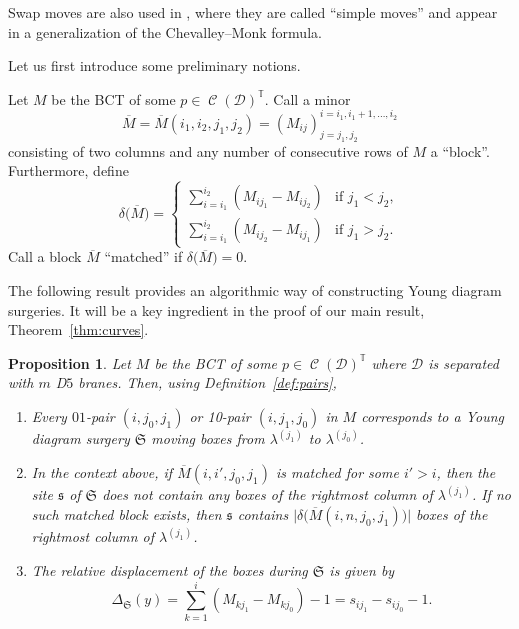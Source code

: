 \documentclass[11pt]{article}
\numberwithin{equation}{section}
\newtheorem{Proposition}[Theorem]{Proposition}
 { \theoremstyle{definition}
\newtheorem{Definition}[Theorem]{Definition}
\newtheorem{Note}[Theorem]{Note}
\newtheorem{Example}[Theorem]{Example}
\newtheorem{Remark}[Theorem]{Remark} }
\newcommand{\brane}{\mathcal D}
\newcommand{\torus}{\mathbb T}
\newcommand{\site}{\mathfrak s}
\newcommand{\surgery}{\mathfrak S}
\DeclareMathOperator{\bowvar}{\mathcal C}
\begin{document}
\begin{Remark}
Swap moves are also used in {\rm\cite{W}}, where they are called ``simple moves'' and appear in a generalization of the Chevalley--Monk formula.
\end{Remark}

Let us first introduce some preliminary notions.

\begin{Definition} \label{def:blocks}
Let $M$ be the BCT of some $p\in\bowvar(\brane)^\torus$. Call a minor
\[
\overline M = \overline{M}(i_1, i_2, j_1, j_2) = \left(M_{ij}\right)^{i = i_1, i_1+1, \dots , i_2}_{j = j_1, j_2}
\]
consisting of two columns and any number of consecutive rows of $M$ a ``block''. Furthermore, define
\[
\delta\bigl(\overline M\bigr) = \begin{cases}
\displaystyle\sum_{i = i_1}^{i_2} (M_{i j_1} - M_{i j_2}) & \text{if }j_1 < j_2, \\
\displaystyle\sum_{i = i_1}^{i_2} (M_{i j_2} - M_{i j_1}) & \text{if }j_1 > j_2.
\end{cases}
\]
Call a block $\overline M$ ``matched'' if $\delta\bigl(\overline M\bigr) = 0$.
\end{Definition}

The following result provides an algorithmic way of constructing Young diagram surgeries. It will be a key ingredient in the proof of our main result, Theorem~\ref{thm:curves}.

\begin{Proposition} \label{prop:BCT_curves}
Let $M$ be the BCT of some $p\in\bowvar(\brane)^\torus$ where $\brane$ is separated with $m$ D$5$ branes. Then, using Definition~{\rm\ref{def:pairs}},
\begin{enumerate}\itemsep=0pt
\item[$(1)$] Every $01$-pair $(i, j_0, j_1)$ or 10-pair $(i, j_1, j_0)$ in $M$ corresponds to a Young diagram surgery $\surgery$ moving boxes from $\lambda^{(j_1)}$ to $\lambda^{(j_0)}$.

\item[$(2)$] In the context above, if $\overline{M}(i, i', j_0, j_1)$ is matched for some $i' > i$, then the site $\site$ of $\surgery$ does not contain any boxes of the rightmost column of $\lambda^{(j_1)}$. If no such matched block exists, then $\site$ contains $\big|\delta\bigl(\overline{M}(i, n, j_0, j_1)\bigr)\big|$ boxes of the rightmost column of $\lambda^{(j_1)}$.

\item[$(3)$] The relative displacement of the boxes during $\surgery$ is given by
\[
\Delta_\surgery(y) = \sum_{k = 1}^{i} (M_{k j_1} - M_{k j_0}) - 1 = s_{i j_1} - s_{i j_0} - 1.
\]
\end{enumerate}
\end{Proposition}
\end{document}
